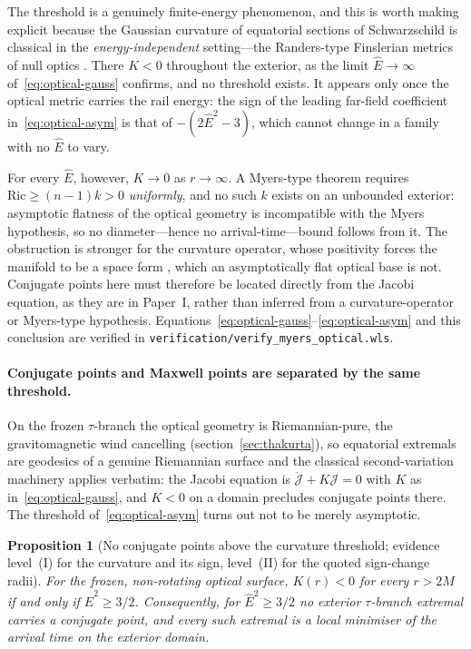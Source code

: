 \documentclass[12pt]{iopart}
\theoremstyle{plain}
\newtheorem{proposition}{Proposition}
\theoremstyle{definition}
\theoremstyle{remark}
\newcommand{\Ehat}{\hat E}
\begin{document}
The threshold is a genuinely finite-energy phenomenon, and this is worth making
explicit because the Gaussian curvature of equatorial sections of Schwarzschild is
classical in the \emph{energy-independent} setting---the Randers-type Finslerian
metrics of null optics \cite{GibbonsWerner2008}. There $K<0$ throughout the
exterior, as the limit $\Ehat\to\infty$ of~\eqref{eq:optical-gauss} confirms, and
no threshold exists. It appears only once the optical metric carries the rail
energy: the sign of the leading far-field coefficient
in~\eqref{eq:optical-asym} is that of $-(2\Ehat^2-3)$, which cannot change in a
family with no $\Ehat$ to vary.

For every $\Ehat$, however, $K\to0$ as $r\to\infty$. A Myers-type theorem
\cite{Myers1941} requires $\mathrm{Ric}\ge(n-1)k>0$ \emph{uniformly}, and no such
$k$ exists on an unbounded exterior: asymptotic flatness of the optical geometry
is incompatible with the Myers hypothesis, so no diameter---hence no
arrival-time---bound follows from it. The obstruction is stronger for the
curvature operator, whose positivity forces the manifold to be a space form
\cite{Hamilton1986,BoehmWilking2008}, which an asymptotically flat optical base
is not. Conjugate points here must therefore be located directly from the Jacobi
equation, as they are in Paper~I, rather than inferred from a curvature-operator
or Myers-type hypothesis. Equations~\eqref{eq:optical-gauss}--\eqref{eq:optical-asym}
and this conclusion are verified in
\texttt{verification/verify\_myers\_optical.wls}.

\paragraph{Conjugate points and Maxwell points are separated by the same
threshold.} On the frozen $\tau$-branch the optical geometry is Riemannian-pure,
the gravitomagnetic wind cancelling (section~\ref{sec:thakurta}), so equatorial
extremals are geodesics of a genuine Riemannian surface and the classical
second-variation machinery applies verbatim: the Jacobi equation is
$\ddot{\mathcal J}+K\mathcal J=0$ with $K$ as in~\eqref{eq:optical-gauss}, and
$K<0$ on a domain precludes conjugate points there. The threshold
of~\eqref{eq:optical-asym} turns out not to be merely asymptotic.

\begin{proposition}[No conjugate points above the curvature threshold;
evidence level~(I) for the curvature and its sign, level~(II) for the quoted
sign-change radii]
\label{prop:noconj}
For the frozen, non-rotating optical surface, $K(r)<0$ for \emph{every} $r>2M$
if and only if $\Ehat^2\ge3/2$. Consequently, for $\Ehat^2\ge3/2$ no exterior
$\tau$-branch extremal carries a conjugate point, and every such extremal is a
local minimiser of the arrival time on the exterior domain.
\end{proposition}
\end{document}
